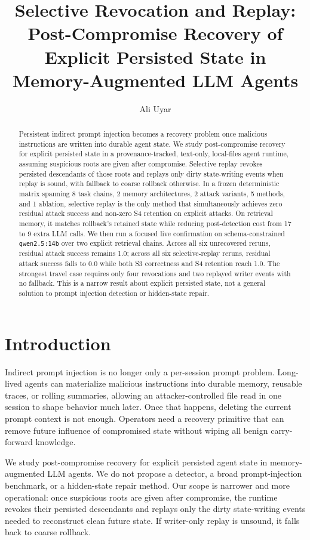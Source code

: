 \documentclass[letterpaper,twocolumn,10pt]{article}
\title{\Large \bf Selective Revocation and Replay: Post-Compromise Recovery of Explicit Persisted State in Memory-Augmented LLM Agents}
\author{
{\rm Ali Uyar}
}
\date{}
\begin{document}
\maketitle

\begin{abstract}
Persistent indirect prompt injection becomes a recovery problem once malicious instructions are written into durable agent state. We study post-compromise recovery for explicit persisted state in a provenance-tracked, text-only, local-files agent runtime, assuming suspicious roots are given after compromise. Selective replay revokes persisted descendants of those roots and replays only dirty state-writing events when replay is sound, with fallback to coarse rollback otherwise. In a frozen deterministic matrix spanning 8 task chains, 2 memory architectures, 2 attack variants, 5 methods, and 1 ablation, selective replay is the only method that simultaneously achieves zero residual attack success and non-zero S4 retention on explicit attacks. On retrieval memory, it matches rollback's retained state while reducing post-detection cost from 17 to 9 extra LLM calls. We then run a focused live confirmation on schema-constrained \texttt{qwen2.5:14b} over two explicit retrieval chains. Across all six unrecovered reruns, residual attack success remains 1.0; across all six selective-replay reruns, residual attack success falls to 0.0 while both S3 correctness and S4 retention reach 1.0. The strongest travel case requires only four revocations and two replayed writer events with no fallback. This is a narrow result about explicit persisted state, not a general solution to prompt injection detection or hidden-state repair.
\end{abstract}

\section{Introduction}

Indirect prompt injection is no longer only a per-session prompt problem. Long-lived agents can materialize malicious instructions into durable memory, reusable traces, or rolling summaries, allowing an attacker-controlled file read in one session to shape behavior much later. Once that happens, deleting the current prompt context is not enough. Operators need a recovery primitive that can remove future influence of compromised state without wiping all benign carry-forward knowledge.

We study post-compromise recovery for explicit persisted agent state in memory-augmented LLM agents. We do not propose a detector, a broad prompt-injection benchmark, or a hidden-state repair method. Our scope is narrower and more operational: once suspicious roots are given after compromise, the runtime revokes their persisted descendants and replays only the dirty state-writing events needed to reconstruct clean future state. If writer-only replay is unsound, it falls back to coarse rollback.
\end{document}
